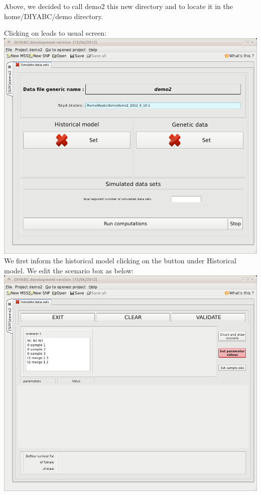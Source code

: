 Above, we decided to call \textsf{demo2} this new directory and to
locate it in the \textsf{home/DIYABC/demo} directory.

Clicking on  leads to usual screen:\\


\includegraphics[scale=0.33]{gui_pictures/Capture-DIYABC-65} \\


We first inform the historical model clicking on the 
button under \textsf{Historical model}. We edit the scenario box as
below:\\


\includegraphics[scale=0.33]{gui_pictures/Capture-DIYABC-66} \\


